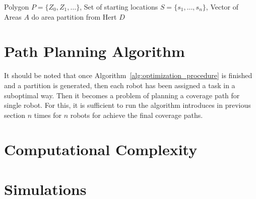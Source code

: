 \documentclass[../main.tex]{subfiles}
\begin{document}
\begin{algorithm}
	\caption{$\operatorname{anchored\_area\_partition}(P, S, A)$}
	\label{alg:anchored_area_partition}
	\begin{algorithmic}[1]
		\REQUIRE Polygon $P=\{Z_0,Z_1,\ldots\}$, Set of starting locations $S=\{s_1,\ldots,s_n\}$, Vector of Areas $A$
		\STATE do area partition from Hert
		\RETURN $D$
	\end{algorithmic}
\end{algorithm}

%


\section{Path Planning Algorithm}
It should be noted that once Algorithm~\ref{alg:optimization_procedure} is finished and a partition is generated, then each robot has been assigned a task in a suboptimal way. Then it becomes a problem of planning a coverage path for single robot. For this, it is sufficient to run the algorithm introduces in previous section $n$ times for $n$ robots for achieve the final coverage paths.



\section{Computational Complexity}

\section{Simulations}
\end{document}

